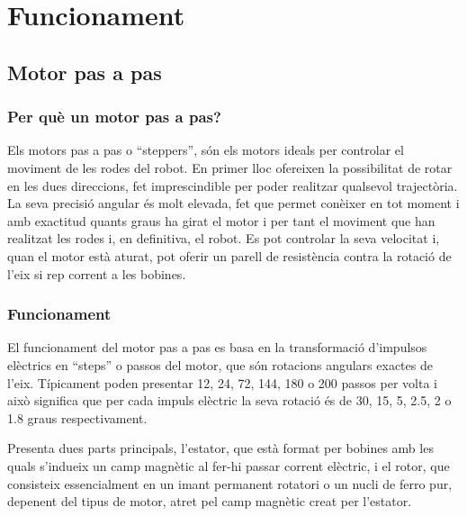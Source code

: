 \setlength\topmargin{8mm}
\onehalfspacing
\chapter{Funcionament} %

\label{Chapter2} %





\section{Motor pas a pas}
\subsection{Per què un motor pas a pas?}

Els motors pas a pas o “steppers”, són els motors ideals per controlar el moviment de les rodes del robot. En primer lloc ofereixen la possibilitat de rotar en les dues direccions, fet imprescindible per poder realitzar qualsevol trajectòria. La seva precisió angular és molt elevada, fet que permet conèixer en tot moment i amb exactitud quants graus ha girat el motor i per tant el moviment que han realitzat les rodes i, en definitiva, el robot. Es pot controlar la seva velocitat i, quan el motor està aturat, pot oferir un parell de resistència contra la rotació de l'eix si rep corrent a les bobines. 

\subsection{Funcionament}
El funcionament del motor pas a pas es basa en la transformació d'impulsos elèctrics en “steps” o passos del motor, que són rotacions angulars exactes de l'eix. Típicament poden presentar 12, 24, 72, 144, 180 o 200 passos per volta i això significa que per cada impuls elèctric la seva rotació és de 30, 15, 5, 2.5, 2 o 1.8 graus respectivament. 

Presenta dues parts principals, l'estator, que està format per bobines amb les quals s'indueix un camp magnètic al fer-hi passar corrent elèctric, i el rotor, que consisteix essencialment en un imant permanent rotatori o un nucli de ferro pur, depenent del tipus de motor, atret pel camp magnètic creat per l'estator. 


